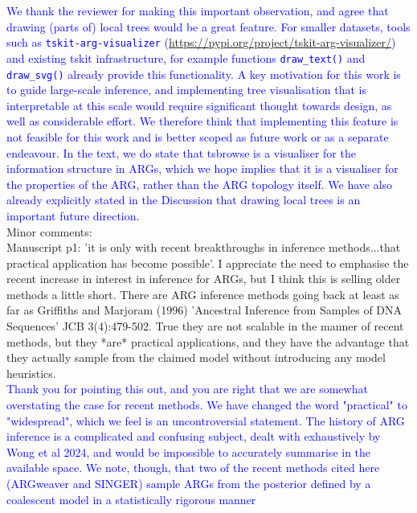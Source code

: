 \documentclass{article}
\begin{document}
\textcolor{blue}{We thank the reviewer for making this important observation, and agree that drawing 
(parts of) local trees would be a great feature. For smaller datasets, tools such as \texttt{tskit-arg-visualizer} 
(\url{https://pypi.org/project/tskit-arg-visualizer/}) and existing tskit infrastructure, for example 
functions \texttt{draw\_text()} and \texttt{draw\_svg()} already provide this functionality. A key 
motivation for this work is to guide large-scale inference, and implementing tree visualisation that is interpretable 
at this scale would require significant thought towards design, as well as considerable effort. We therefore 
think that implementing this feature is not feasible for this work and is better scoped as future work or as 
a separate endeavour. In the text, we do state that tsbrowse is a visualiser for the information structure 
in ARGs, which we hope implies that it is a visualiser for the properties of the ARG, rather than the ARG 
topology itself. We have also already explicitly stated in the Discussion that drawing local trees is an 
important future direction.}\\

Minor comments:\\

Manuscript p1: 'it is only with recent breakthroughs in inference methods...that practical application 
has become possible'. I appreciate the need to emphasise the recent increase in interest in inference for ARGs, 
but I think this is selling older methods a little short. There are ARG inference methods going back at least 
as far as Griffiths and Marjoram (1996) 'Ancestral Inference from Samples of DNA Sequences' JCB 3(4):479-502. 
True they are not scalable in the manner of recent methods, but they *are* practical applications, and they have 
the advantage that they actually sample from the claimed model without introducing any model heuristics.\\

\textcolor{blue}{Thank you for pointing this out, and you are right that we are somewhat overstating the 
case for recent methods. We have changed the word "practical" to "widespread", which we feel is an uncontroversial 
statement. The history of ARG inference is a complicated and confusing subject, dealt with exhaustively by 
Wong et al 2024, and would be impossible to accurately summarise in the available space. We note, though, 
that two of the recent methods cited here (ARGweaver and SINGER) sample ARGs from the posterior defined by a 
coalescent model in a statistically rigorous manner}
\end{document}
